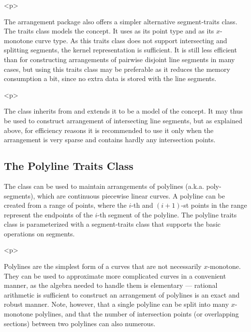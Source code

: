 \begin{ccHtmlOnly}<p>\end{ccHtmlOnly}
The arrangement package also offers a simpler alternative
segment-traits class. The traits class
 models 
the  concept. It uses
 as its point type and
 as its $x$-monotone curve type. As this
traits class does not support intersecting and splitting segments,
the kernel representation is sufficient. It is still less
efficient than  for constructing
arrangements of pairwise disjoint line segments in many cases, but
using this traits class may be preferable as it reduces the memory
consumption a bit, since no extra data is stored with the line
segments.

\begin{ccHtmlOnly}<p>\end{ccHtmlOnly}
The class  inherits
from  and
extends it to be a model of the  concept.
It may thus be used to construct arrangement of intersecting line
segments, but as explained above, for efficiency reasons it is
recommended to use it only when the arrangement is very sparse and
contains hardly any intersection points.

\subsection{The Polyline Traits Class}
\label{arr_ssec:tr_polylines}
%
The  class can be used
to maintain arrangements of polylines (a.k.a. poly-segments),
which are continuous piecewise linear curves. A polyline can be
created from a range of points, where the $i$-th and $(i+1)$-st
points in the range represent the endpoints of the $i$-th segment
of the polyline. The polyline traits class is parameterized with a
segment-traits class that supports the basic operations on
segments.

\begin{ccHtmlOnly}<p>\end{ccHtmlOnly}
Polylines are the simplest form of a curves that are not
necessarily $x$-monotone. They can be used to approximate more
complicated curves in a convenient manner, as the algebra needed
to handle them is elementary --- rational arithmetic is sufficient
to construct an arrangement of polylines is an exact and robust
manner. Note, however, that a single polyline can be split into
many $x$-monotone polylines, and that the number of intersection
points (or overlapping sections) between two polylines can also
numerous. 

